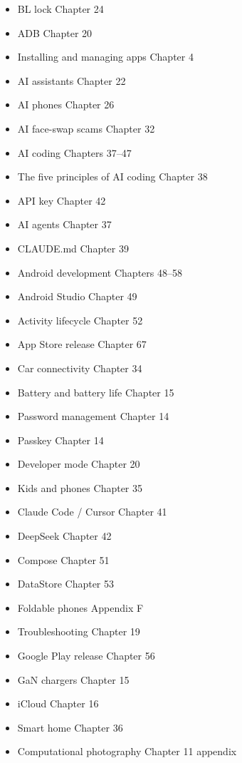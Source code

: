 


\begin{itemize}
  \item BL lock Chapter 24
  \item ADB Chapter 20
  \item Installing and managing apps Chapter 4
  \item AI assistants Chapter 22
  \item AI phones Chapter 26
  \item AI face-swap scams Chapter 32
  \item AI coding Chapters 37–47
  \item The five principles of AI coding Chapter 38
  \item API key Chapter 42
  \item AI agents Chapter 37
  \item CLAUDE.md Chapter 39
  \item Android development Chapters 48–58
  \item Android Studio Chapter 49
  \item Activity lifecycle Chapter 52
  \item App Store release Chapter 67
\end{itemize}


\begin{itemize}
  \item Car connectivity Chapter 34
  \item Battery and battery life Chapter 15
  \item Password management Chapter 14
  \item Passkey Chapter 14
  \item Developer mode Chapter 20
  \item Kids and phones Chapter 35
  \item Claude Code / Cursor Chapter 41
  \item DeepSeek Chapter 42
  \item Compose Chapter 51
  \item DataStore Chapter 53
\end{itemize}


\begin{itemize}
  \item Foldable phones Appendix F
  \item Troubleshooting Chapter 19
  \item Google Play release Chapter 56
  \item GaN chargers Chapter 15
  \item iCloud Chapter 16
  \item Smart home Chapter 36
  \item Computational photography Chapter 11 appendix
\end{itemize}

